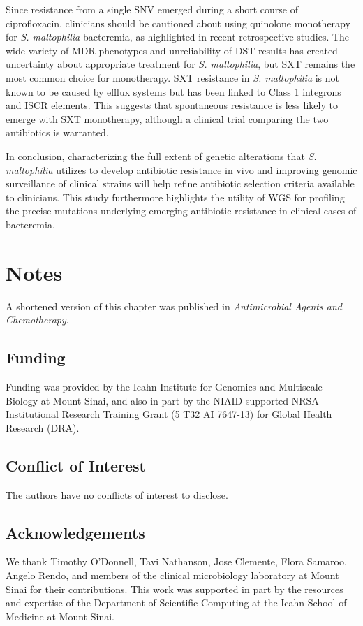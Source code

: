 Since resistance from a single SNV emerged during a short course of ciprofloxacin, clinicians should be cautioned about using quinolone monotherapy for \emph{S. maltophilia} bacteremia, as highlighted in recent retrospective studies.\autocite{Cho2014a,Wang2014} The wide variety of MDR phenotypes and unreliability of DST results has created uncertainty about appropriate treatment for \emph{S. maltophilia}, but SXT remains the most common choice for monotherapy.\autocite{Brooke2012,Cho2014a,Wang2014} SXT resistance in \emph{S. maltophilia} is not known to be caused by efflux systems but has been linked to Class 1 integrons and ISCR elements.\autocite{Brooke2012} This suggests that spontaneous resistance is less likely to emerge with SXT monotherapy, although a clinical trial comparing the two antibiotics is warranted.\autocite{Cho2014a,Wang2014}

In conclusion, characterizing the full extent of genetic alterations that \emph{S. maltophilia} utilizes to develop antibiotic resistance in vivo and improving genomic surveillance of clinical strains will help refine antibiotic selection criteria available to clinicians. This study furthermore highlights the utility of WGS for profiling the precise mutations underlying emerging antibiotic resistance in clinical cases of bacteremia.

\section*{Notes}

A shortened version of this chapter was published in \textit{Antimicrobial Agents and Chemotherapy}.\autocite{Pak2015a}

\subsection{Funding}

Funding was provided by the Icahn Institute for Genomics and Multiscale Biology at Mount Sinai, and also in part by the NIAID-supported NRSA Institutional Research Training Grant (5 T32 AI 7647-13) for Global Health Research (DRA).

\subsection{Conflict of Interest}

The authors have no conflicts of interest to disclose.

\subsection{Acknowledgements}

We thank Timothy O’Donnell, Tavi Nathanson, Jose Clemente, Flora Samaroo, Angelo Rendo, and members of the clinical microbiology laboratory at Mount Sinai for their contributions. This work was supported in part by the resources and expertise of the Department of Scientific Computing at the Icahn School of Medicine at Mount Sinai.